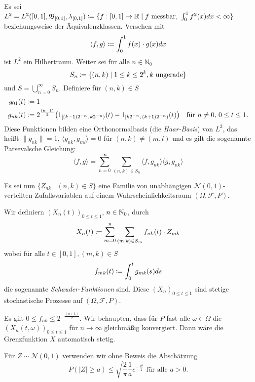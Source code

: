 \documentclass[a4paper,twoside,DIV15,BCOR12mm]{scrbook}
\newcommand{\cF}{\mathcal F}
\newcommand{\borel}{{\mathfrak B}}
\begin{document}
\begin{beweis}

Es sei $L^2=L^2([0,1],\borel_{[0,1]}, \lambda_{[0,1]}) \da \{f :[0,1]\to \MdR\mid f \text{ messbar, } \int_0^1 f^2(x)dx <\infty\}$ beziehungsweise der Äquivalenzklassen. Versehen mit
\[
\langle f,g \rangle \da \int_0^1 f(x)\cdot g(x) dx
\]
ist $L^2$ ein Hilbertraum. Weiter sei für alle $n\in \mathbb N_0$
\[
S_n\da\{(n,k) \mid 1\le k \le 2^k, k\text{ ungerade}\}
\]
und $S=\bigcup_{n=0}^\infty S_n$. Definiere für $(n,k)\in S$
\begin{align*}
g_{01}(t) &\da 1\\
g_{nk}(t) &\da 2^{\frac{(n-1)}2}\big( 1_{[(k-1)2^{-n},\,k2^{-n})}(t) - 1_{[k2^{-n},\,(k+1)2^{-n})}(t)\big) \quad \text{für } n\ne 0,\,0\le t\le 1.
\end{align*}
Diese Funktionen bilden eine Orthonormalbasis (die \emph{Haar-Basis}) von $L^2$, das heißt $\|g_{nk}\|=1$, $\langle g_{nk},g_{ml} \rangle = 0$ für $(n,k)\ne (m,l)$ und es gilt die sogenannte Parsevalsche Gleichung:
\[
\langle f,g\rangle = \sum_{n=0}^\infty \sum_{(n,k)\in S_n} \langle f,g_{nk}\rangle\langle g,g_{nk}\rangle
\]

Es sei nun $\{Z_{nk} \mid (n,k)\in S\}$ eine Familie von unabhängigen $\mathcal N(0,1)$-verteilten Zufallsvariablen auf einem Wahrscheinlichkeitsraum $(\Omega, \cF, P)$.

Wir definiern $(X_n(t))_{0\le t\le 1}$, $n\in \mathbb{N}_0$, durch
\begin{align*}
X_n(t) \da \sum_{m=0}^n \sum_{(m,k)\in S_m} f_{nk}(t) \cdot Z_{mk}
\end{align*}
wobei für alle $t\in[0,1], (m,k)\in S$
\begin{align*}
f_{mk}(t) \da \int_0^t g_{mk}(s) ds 
\end{align*}
die sogenannte \emph{Schauder-Funktionen} sind. Diese $(X_n)_{0\le t\le 1}$ sind stetige stochastische Prozesse auf $(\Omega,\cF, P)$.

Es gilt $0\le f_{nk} \le 2^{-\frac{(n+1)}2}$. Wir behaupten, dass für $P$-fast-alle $\omega\in \Omega$ die $(X_n(t,\omega))_{0\le t\le 1}$ für $n\to\infty$ gleichmäßig konvergiert. Dann wäre die Grenzfunktion $X$ automatisch stetig.

Für $Z\sim \mathcal N(0,1)$ verwenden wir ohne Beweis die Abschätzung
\[
P(|Z|\ge a) \le \sqrt {\frac2\pi}\frac 1a e^{-\frac{a^2}2}\text{ für alle }a>0.
\]


\end{beweis}
\end{document}

